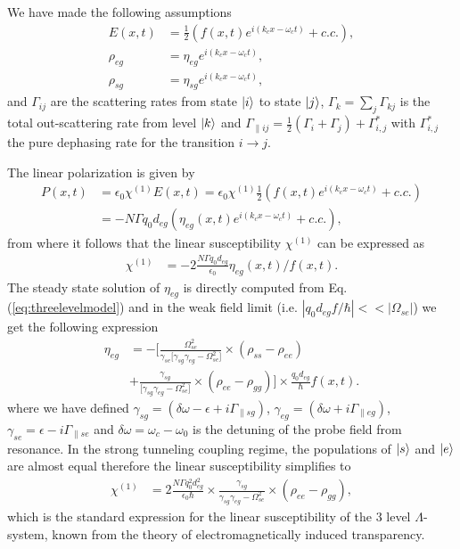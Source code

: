 \documentclass[twocolumn,secnumarabic,amssymb, nobibnotes, aps, prd]{revtex4-1}
\begin{document}
We have made the following assumptions
\begin{align}
E(x,t) &= \frac{1}{2} (f(x,t) e^{i(k_cx-\omega_c t)}+c.c.),\\
\rho_{eg} &= \eta_{eg}e^{i(k_cx-\omega_c t)}, \\
\rho_{sg} &= \eta_{sg}e^{i(k_cx-\omega_c t)}, 
\end{align}
and $\Gamma_{ij} $ are the scattering rates from state $\ket{i}$ to state $\ket{j}$, $\Gamma_k = \sum_{j}\Gamma_{kj}$ is the total out-scattering rate from level $\ket{k}$ and $\Gamma_{\parallel ij} = \frac{1}{2}(\Gamma_{i} + \Gamma_j) + \Gamma_{i,j}^*$ with $\Gamma_{i,j}^*$ the pure dephasing rate for the transition $i\rightarrow j$. 

The linear polarization is given by
\begin{align}
P(x,t) &=\epsilon_0 \chi^{(1)} E(x,t) = \epsilon_0 \chi^{(1)} \frac{1}{2}( f(x,t) e^{i(k_cx-\omega_c t)}+c.c.) \nonumber \\  
	  &= -N\Gamma q_0d_{eg}(\eta_{eg}(x,t)e^{i(k_cx-\omega_c t)} + c.c.),
\end{align}
from where it follows that the linear susceptibility $\chi^{(1)}$ can be expressed as
\begin{align}
\chi^{(1)} &= -2\frac{N\Gamma q_0d_{eg}}{\epsilon_0 } \eta_{eg}(x,t)/f(x,t).
\end{align}
The steady state solution of $\eta_{eg}$ is directly computed from Eq. (\ref{eq:threelevelmodel}) and in the weak field limit (i.e. $|q_0d_{eg}f/\hbar| << |\Omega_{se}|$) we get the following expression
\begin{align}
\eta_{eg}  &= -[ \frac{\Omega_{se}^2}{ \gamma_{se} \big[\gamma_{sg}\gamma_{eg} -\Omega_{se}^2\big ] }\times (\rho_{ss}-\rho_{ee})  \nonumber \\
		 &+ \frac{\gamma_{sg}}{\big[\gamma_{sg}\gamma_{eg} -\Omega_{se}^2\big ] }\times (\rho_{ee}-\rho_{gg}) ]\times \frac{q_0d_{eg}}{\hbar}f(x,t). 
\end{align}
where we have defined $\gamma_{sg} =(\delta\omega - \epsilon + i\Gamma_{\parallel sg}) $, $\gamma_{eg} =(\delta\omega + i\Gamma_{\parallel eg})$, $\gamma_{se} = \epsilon - i\Gamma_{\parallel se}$ and $\delta\omega = \omega_c-\omega_0$ is the detuning of the probe field from resonance. In the strong tunneling coupling regime, the populations of $\ket{s}$ and $\ket{e}$ are almost equal therefore the linear susceptibility simplifies to
\begin{align}
\chi^{(1)} &= 2\frac{N\Gamma q_0^2d_{eg}^2}{\epsilon_0 \hbar}  \times \frac{\gamma_{sg}}{\gamma_{sg}\gamma_{eg} -\Omega_{se}^2  }\times (\rho_{ee}-\rho_{gg}),
\end{align}
which is the standard expression for the linear susceptibility of the 3 level $\Lambda$-system, known from the theory of electromagnetically induced transparency. 
\end{document}
